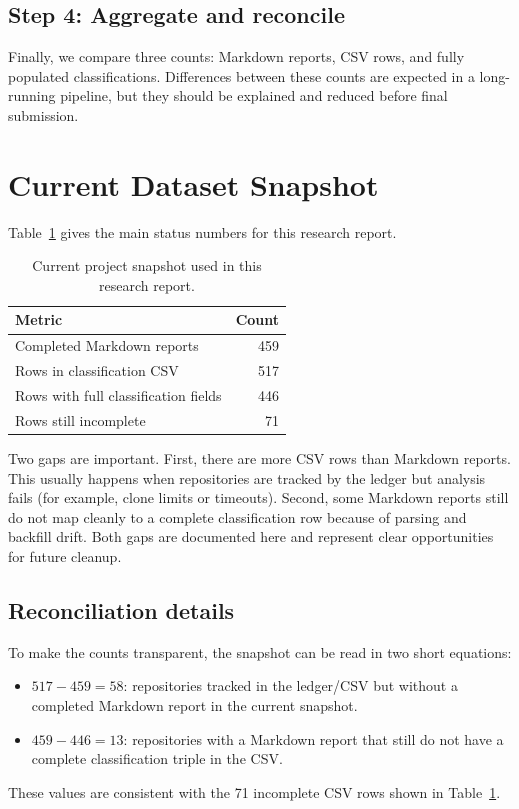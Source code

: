 \documentclass[12pt,a4paper,onecolumn]{article}
\begin{document}
\subsection{Step 4: Aggregate and reconcile}
Finally, we compare three counts: Markdown reports, CSV rows, and fully populated classifications. Differences between these counts are expected in a long-running pipeline, but they should be explained and reduced before final submission.

\section{Current Dataset Snapshot}
Table~\ref{tab:snapshot} gives the main status numbers for this research report.

\begin{table}[ht]
\centering
\begin{tabular}{lr}
\toprule
Metric & Count \\
\midrule
Completed Markdown reports & 459 \\
Rows in classification CSV & 517 \\
Rows with full classification fields & 446 \\
Rows still incomplete & 71 \\
\bottomrule
\end{tabular}
\caption{Current project snapshot used in this research report.}
\label{tab:snapshot}
\end{table}

Two gaps are important. First, there are more CSV rows than Markdown reports. This usually happens when repositories are tracked by the ledger but analysis fails (for example, clone limits or timeouts). Second, some Markdown reports still do not map cleanly to a complete classification row because of parsing and backfill drift. Both gaps are documented here and represent clear opportunities for future cleanup.

\subsection{Reconciliation details}
To make the counts transparent, the snapshot can be read in two short equations:
\begin{itemize}
  \item \(517 - 459 = 58\): repositories tracked in the ledger/CSV but without a completed Markdown report in the current snapshot.
  \item \(459 - 446 = 13\): repositories with a Markdown report that still do not have a complete classification triple in the CSV.
\end{itemize}
These values are consistent with the 71 incomplete CSV rows shown in Table~\ref{tab:snapshot}.
\end{document}
